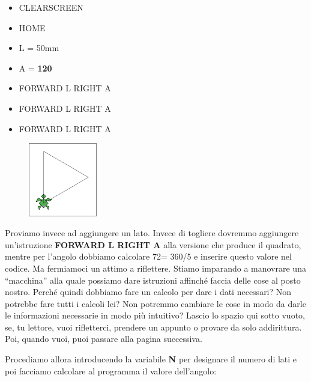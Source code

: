 \vskip 1cm

\begin{scriptsize}
\begin{minipage}{0.40\textwidth}
\begin{itemize}[itemsep=-3pt,parsep=2pt]
\item[] CLEARSCREEN          
\item[] HOME
\item[] L = 50mm
\item[] A = \textbf{120}	
\item[] FORWARD L RIGHT A
\item[] FORWARD L RIGHT A
\item[] FORWARD L RIGHT A
\end{itemize}
\end{minipage}
\end{scriptsize}
\begin{minipage}{0.4\textwidth}
\begin{figure}[H]
   \includegraphics[width=3.0cm,trim=4 4 8 4,clip]{./images/ripetere/ripetere-2.png}
   \label{rip-1-b}
\end{figure}
\end{minipage} \hfill

\vskip 1cm

Proviamo invece ad aggiungere un lato. Invece di togliere dovremmo aggiungere un'istruzione \textbf{FORWARD L RIGHT A} alla versione che produce il quadrato, mentre per l'angolo dobbiamo calcolare 72\degree = 360\degree/5 e inserire questo valore nel codice. Ma fermiamoci un attimo a riflettere. Stiamo imparando a manovrare una “macchina” alla quale possiamo dare istruzioni affinché faccia delle cose al posto nostro. Perché quindi dobbiamo fare un calcolo per dare i dati necessari? Non potrebbe fare tutti i calcoli lei?  Non potremmo cambiare le cose in modo da darle le informazioni necessarie in modo più intuitivo? Lascio lo spazio qui sotto vuoto, se, tu lettore, vuoi rifletterci, prendere un appunto o provare da solo addirittura. Poi, quando vuoi, puoi passare alla pagina successiva.

\pagebreak

Procediamo allora introducendo la variabile \textbf{N} per designare il numero di lati  e poi facciamo calcolare al programma il valore dell'angolo:


